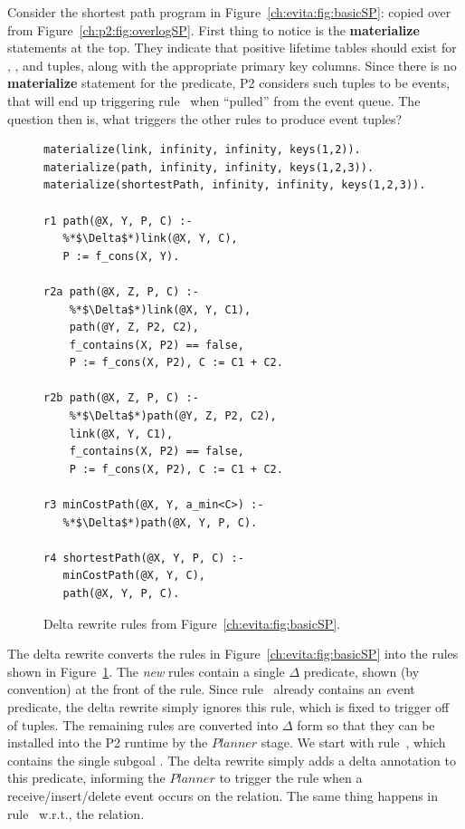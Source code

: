 Consider the shortest path program in Figure~\ref{ch:evita:fig:basicSP}: copied
over from Figure~\ref{ch:p2:fig:overlogSP}.  First thing to notice is the {\bf
materialize} statements at the top.  They indicate that positive lifetime
tables should exist for , , and  tuples,
along with the appropriate primary key columns.  Since there is no {\bf
materialize} statement for the  predicate, P2 considers such
tuples to be events, that will end up triggering rule~ when ``pulled''
from the event queue.  The question then is, what triggers the other rules to
produce  event tuples?

\begin{figure}[!t]
\ssp
\centering
\begin{lstlisting}
materialize(link, infinity, infinity, keys(1,2)).
materialize(path, infinity, infinity, keys(1,2,3)).
materialize(shortestPath, infinity, infinity, keys(1,2,3)).

r1 path(@X, Y, P, C) :-
   %*$\Delta$*)link(@X, Y, C), 
   P := f_cons(X, Y).

r2a path(@X, Z, P, C) :-
    %*$\Delta$*)link(@X, Y, C1), 
    path(@Y, Z, P2, C2),
    f_contains(X, P2) == false,
    P := f_cons(X, P2), C := C1 + C2.

r2b path(@X, Z, P, C) :-
    %*$\Delta$*)path(@Y, Z, P2, C2), 
    link(@X, Y, C1),
    f_contains(X, P2) == false,
    P := f_cons(X, P2), C := C1 + C2.

r3 minCostPath(@X, Y, a_min<C>) :-
   %*$\Delta$*)path(@X, Y, P, C).

r4 shortestPath(@X, Y, P, C) :-
   minCostPath(@X, Y, C), 
   path(@X, Y, P, C).
\end{lstlisting}
\caption{\label{ch:evita:fig:basicSPDelta}Delta rewrite rules from Figure~\ref{ch:evita:fig:basicSP}.}
\end{figure}

The delta rewrite converts the rules in Figure~\ref{ch:evita:fig:basicSP} into
the rules shown in Figure~\ref{ch:evita:fig:basicSPDelta}.  The {\em new} rules
contain a single $\Delta$ predicate, shown (by convention) at the front of the
rule.  Since rule~ already contains an {\emph event} predicate, the
delta rewrite simply ignores this rule, which is fixed to trigger off of
 tuples.  The remaining rules are converted into $\Delta$ form
so that they can be installed into the P2 runtime by the $Planner$ stage.  We
start with rule~, which contains the single subgoal .  The
delta rewrite simply adds a delta annotation to this predicate, informing the
$Planner$ to trigger the rule when a receive/insert/delete event occurs on the
 relation.  The same thing happens in rule~ w.r.t., the
 relation.

